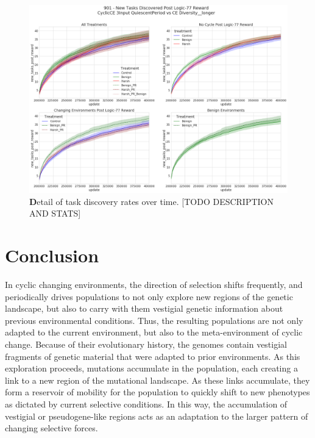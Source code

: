 \documentclass[PhD]{msu-thesis}
\begin{document}
\begin{figure}[!h]
\includegraphics[trim={0 0 0 0}, clip, width=1\columnwidth]{figures/CE/901_postreward_composites_task_discovery.png}
\caption{{\textbf Detail of task discovery rates over time}. [TODO DESCRIPTION AND STATS]%
}
\label{fig:composite_task_discovery}
\end{figure}

\section{Conclusion}
In cyclic changing environments, the direction of selection shifts frequently, and periodically drives populations to not only explore new regions of the genetic landscape, but also to carry with them vestigial genetic information about previous environmental conditions. Thus, the resulting populations are not only adapted to the current environment, but also to the meta-environment of cyclic change. Because of their evolutionary history, the genomes contain vestigial fragments of genetic material that were adapted to prior environments. As this exploration proceeds, mutations accumulate in the population, each creating a link to a new region of the mutational landscape. As these links accumulate, they form a reservoir of mobility for the population to quickly shift to new phenotypes as dictated by current selective conditions. In this way, the accumulation of vestigial or pseudogene-like regions acts as an adaptation to the larger pattern of changing selective forces.
\end{document}
